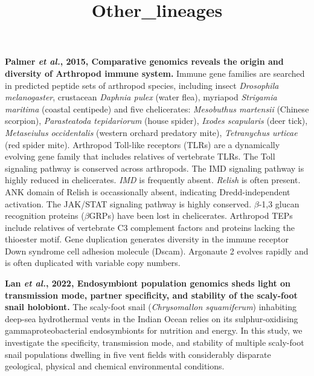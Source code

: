 \documentclass[11pt]{article}
\title{Other_lineages}
\author{}
\date{}
\begin{document}
\begin{sloppypar}
  \maketitle

  \linenumbers
\textbf{Palmer \textit{et al.}, 2015, Comparative genomics reveals the origin and diversity of Arthropod immune system.} \newline
Immune gene families are searched in predicted peptide sets of arthropod species, including 
insect \textit{Drosophila melanogaster}, 
crustacean \textit{Daphnia pulex} (water flea), 
myriapod \textit{Strigamia maritima} (coastal centipede) and 
five chelicerates: \textit{Mesobuthus martensii} (Chinese scorpion), 
                    \textit{Parasteatoda tepidariorum} (house spider),
                    \textit{Ixodes scapularis} (deer tick),
                    \textit{Metaseiulus occidentalis} (western orchard predatory mite),
                    \textit{Tetranychus urticae} (red spider mite). 
Arthropod Toll-like receptors (TLRs) are a dynamically evolving gene family that includes relatives of vertebrate TLRs. 
The Toll signaling pathway is conserved across arthropods. 
The IMD signaling pathway is highly reduced in chelicerates. 
\textit{IMD} is frequently absent. 
\textit{Relish} is often present. 
ANK domain of Relish is occassionally absent, indicating Dredd-independent activation. 
The JAK/STAT signaling pathway is highly conserved. 
$\beta$-1,3 glucan recognition proteins ($\beta$GRPs) have been lost in chelicerates. 
Arthropod TEPs include relatives of vertebrate C3 complement factors and proteins lacking the thioester motif. 
Gene duplication generates diversity in the immune receptor Down syndrome cell adhesion molecule (Dscam). 
Argonaute 2 evolves rapidly and is often duplicated with variable copy numbers.
\par
\textbf{Lan \textit{et al.}, 2022, Endosymbiont population genomics sheds light on transmission mode, partner specificity, and stability of the scaly-foot snail holobiont.} \newline
The scaly-foot snail (\textit{Chrysomallon squamiferum}) inhabiting deep-sea hydrothermal vents in the Indian Ocean relies on its sulphur-oxidising gammaproteobacterial endosymbionts for nutrition and energy. 
In this study, we investigate the specificity, transmission mode, and stability of multiple scaly-foot snail populations dwelling in five vent fields with considerably disparate geological, physical and chemical environmental conditions. 

\end{sloppypar}
\end{document}
